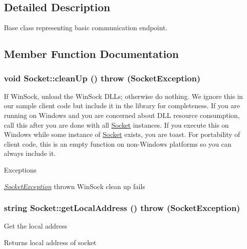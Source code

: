 \subsection{Detailed Description}
Base class representing basic communication endpoint. 

\subsection{Member Function Documentation}
\hypertarget{classSocket_ac5060aeb501044044351d5a85b3fc95f}{
\subsubsection[{cleanUp}]{\setlength{\rightskip}{0pt plus 5cm}void Socket::cleanUp ()  throw ({\bf SocketException})}}
\label{classSocket_ac5060aeb501044044351d5a85b3fc95f}
If WinSock, unload the WinSock DLLs; otherwise do nothing. We ignore this in our sample client code but include it in the library for completeness. If you are running on Windows and you are concerned about DLL resource consumption, call this after you are done with all \hyperlink{classSocket}{Socket} instances. If you execute this on Windows while some instance of \hyperlink{classSocket}{Socket} exists, you are toast. For portability of client code, this is an empty function on non-\/Windows platforms so you can always include it. 
\begin{DoxyExceptions}{Exceptions}
\item[{\em \hyperlink{classSocketException}{SocketException}}]thrown WinSock clean up fails \end{DoxyExceptions}
\hypertarget{classSocket_a0fca07bdfa97874fba1a17995ed7cda3}{
\subsubsection[{getLocalAddress}]{\setlength{\rightskip}{0pt plus 5cm}string Socket::getLocalAddress ()  throw ({\bf SocketException})}}
\label{classSocket_a0fca07bdfa97874fba1a17995ed7cda3}
Get the local address \begin{DoxyReturn}{Returns}
local address of socket 
\end{DoxyReturn}

